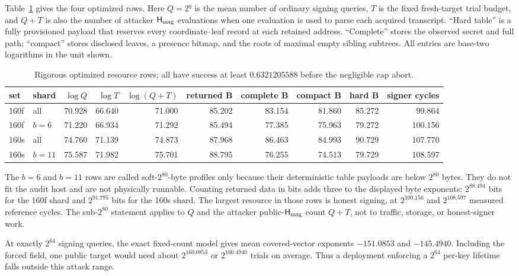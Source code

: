 \documentclass[11pt,a4paper]{article}
\newcommand{\Hmsg}{\ensuremath{\mathsf{H}_{\rm msg}}}
\begin{document}
Table~\ref{tab:headline} gives the four optimized rows.  Here $Q=2^q$ is the
mean number of ordinary signing queries, $T$ is the fixed fresh-target trial
budget, and $Q+T$ is also the number of attacker $\Hmsg$ evaluations when one
evaluation is used to parse each acquired transcript.  ``Hard table'' is a
fully provisioned payload that reserves every coordinate--leaf record at each
retained address.  ``Complete'' stores the observed secret and full path;
``compact'' stores disclosed leaves, a presence bitmap, and the roots of
maximal empty sibling subtrees.  All entries are base-two logarithms in the
unit shown.

\begin{table}[ht]
\centering
\small
\caption{Rigorous optimized resource rows; all have success at least
$0.6321205588$ before the negligible cap abort.}
\label{tab:headline}
\setlength{\tabcolsep}{3.2pt}
\begin{tabular}{llrrrrrrrr}
\toprule
set & shard & $\log Q$ & $\log T$ & $\log(Q+T)$ & returned B & complete B & compact B & hard B & signer cycles\\
\midrule
160f & all     &70.928&66.640&71.000&85.202&83.154&81.860&85.272& 99.864\\
160f & $b=6$  &71.220&66.934&71.292&85.494&77.385&75.963&79.272&100.156\\
160s & all     &74.760&71.139&74.873&87.968&86.463&84.993&90.729&107.770\\
160s & $b=11$ &75.587&71.982&75.701&88.795&76.255&74.513&79.729&108.597\\
\bottomrule
\end{tabular}
\end{table}

The $b=6$ and $b=11$ rows are called soft-$2^{80}$-byte profiles only because
their deterministic table payloads are below $2^{80}$ bytes.  They do not fit
the audit host and are not physically runnable.  Counting returned data in
bits adds three to the displayed byte exponents: $2^{88.494}$ bits for the
160f shard and $2^{91.795}$ bits for the 160s shard.  The largest resource in
those rows is honest signing, at $2^{100.156}$ and $2^{108.597}$ measured
reference cycles.  The sub-$2^{80}$ statement applies to $Q$ and the attacker
public-$\Hmsg$ count $Q+T$, not to traffic, storage, or honest-signer work.

At exactly $2^{64}$ signing queries, the exact fixed-count model gives mean
covered-vector exponents $-151.0853$ and $-145.4940$.  Including the forced
field, one public target would need about $2^{160.0853}$ or $2^{160.4940}$
trials on average.  Thus a deployment enforcing a $2^{64}$ per-key lifetime
falls outside this attack range.
\end{document}
